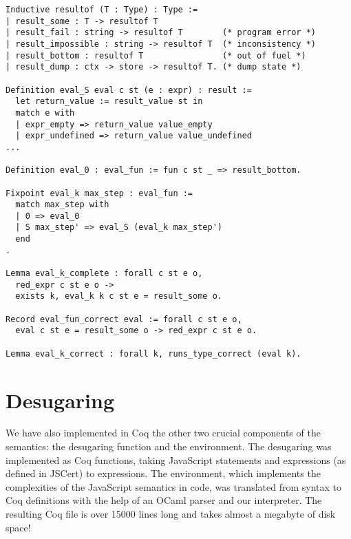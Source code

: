 \documentclass{llncs}
\newcommand{\asi}[1]{\todo[color=green,inline]{#1}}
\begin{document}
\begin{verbatim}
Inductive resultof (T : Type) : Type :=
| result_some : T -> resultof T
| result_fail : string -> resultof T        (* program error *)
| result_impossible : string -> resultof T  (* inconsistency *)
| result_bottom : resultof T                (* out of fuel *)
| result_dump : ctx -> store -> resultof T. (* dump state *)

Definition eval_S eval c st (e : expr) : result :=
  let return_value := result_value st in
  match e with
  | expr_empty => return_value value_empty
  | expr_undefined => return_value value_undefined
...

Definition eval_0 : eval_fun := fun c st _ => result_bottom.

Fixpoint eval_k max_step : eval_fun :=
  match max_step with
  | 0 => eval_0
  | S max_step' => eval_S (eval_k max_step')
  end
.

Lemma eval_k_complete : forall c st e o,
  red_expr c st e o -> 
  exists k, eval_k k c st e = result_some o.

Record eval_fun_correct eval := forall c st e o,
  eval c st e = result_some o -> red_expr c st e o.

Lemma eval_k_correct : forall k, runs_type_correct (eval k). 
\end{verbatim}

\asi{Add the theorem.}



\section{Desugaring}
\label{sec:desugaring}

We have also implemented in Coq the other two crucial components
of the \lambdajs semantics: the desugaring function and the 
environment. The desugaring was implemented as Coq functions,
taking JavaScript statements and expressions (as defined in
JSCert) to \lambdajs expressions. The environment, which
implements the complexities of the JavaScript semantics
in \lambdajs code, was translated from \lambdajs syntax
to Coq definitions with the help of an OCaml parser and
our interpreter. The resulting Coq file is over 15000 lines long
and takes almost a megabyte of disk space!
\end{document}
